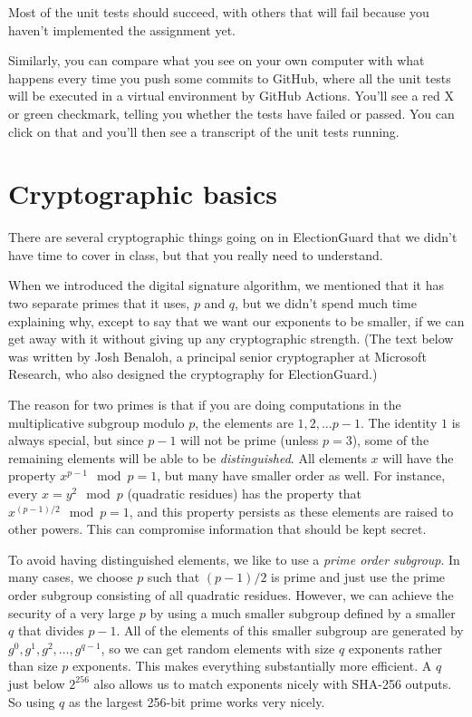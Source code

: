 Most of the unit tests should succeed, with others that will fail because you haven't
implemented the assignment yet.

Similarly, you can compare what you see on your own computer with
what happens every time you push some commits to GitHub, where all
the unit tests will be executed in a virtual environment
by GitHub Actions. You'll see a red X or green checkmark, telling you
whether the tests have failed or passed. You can click on that
and you'll then see a transcript of the unit tests running.

\section{Cryptographic basics}
There are several cryptographic things going on in ElectionGuard that
we didn't have time to cover in class, but that you really need to
understand.

When we introduced the digital signature algorithm, we mentioned that
it has two separate primes that it uses, $p$ and $q$, but we didn't
spend much time explaining why, except to say that we want our
exponents to be smaller, if we can get away with it without giving up
any cryptographic strength. (The text below was written by 
Josh Benaloh, a principal senior cryptographer at Microsoft Research,
who also designed the cryptography for ElectionGuard.)

The reason for two primes is that if you are doing computations in the
multiplicative subgroup modulo $p$, the elements are ${1,2,\ldots p-1}$. The
identity $1$ is always special, but since $p-1$ will not be prime (unless
$p=3$), some of the remaining elements will be able to be {\em distinguished}.
All elements $x$ will have the property $x^{p-1}\mod p = 1$, but many have
smaller order as well. For instance, every $x=y^2\mod p$ (quadratic
residues) has the property that $x^{(p-1)/2}\mod p = 1$, and this
property persists as these elements are raised to other powers. This
can compromise information that should be kept secret.
 

To avoid having distinguished elements, we like to use a {\em prime order
subgroup}. In many cases, we choose $p$ such that $(p-1)/2$ is prime and
just use the prime order subgroup consisting of all quadratic
residues. However, we can achieve the security of a very large $p$ by
using a much smaller subgroup defined by a smaller $q$ that divides
$p-1$. All of the elements of this smaller subgroup are generated by
$g^0,g^1, g^2,\ldots, g^{q-1}$, so we can get random elements with size $q$
exponents rather than size $p$ exponents. This makes everything
substantially more efficient. A $q$ just below $2^{256}$ also allows us to
match exponents nicely with SHA-256 outputs. So using $q$ as the largest
256-bit prime works very nicely.
 

